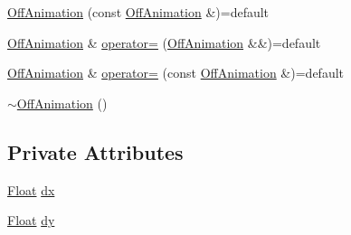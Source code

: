 \begin{DoxyCompactItemize}
\item 
\hyperlink{classZeta_1_1OffAnimation_a35d1389cd458d4e364e732fe7f0a68b8}{Off\+Animation} (const \hyperlink{classZeta_1_1OffAnimation}{Off\+Animation} \&)=default
\item 
\hyperlink{classZeta_1_1OffAnimation}{Off\+Animation} \& \hyperlink{classZeta_1_1OffAnimation_a10c6dd51ce28d6c4ec72d0f38b6c0237}{operator=} (\hyperlink{classZeta_1_1OffAnimation}{Off\+Animation} \&\&)=default
\item 
\hyperlink{classZeta_1_1OffAnimation}{Off\+Animation} \& \hyperlink{classZeta_1_1OffAnimation_ac192d9ec8923e7b494fc12796eea98fe}{operator=} (const \hyperlink{classZeta_1_1OffAnimation}{Off\+Animation} \&)=default
\item 
\hyperlink{classZeta_1_1OffAnimation_af077c1c6a11064df0bbec8d0255c6f6c}{$\sim$\+Off\+Animation} ()
\end{DoxyCompactItemize}
\subsection*{Private Attributes}
\begin{DoxyCompactItemize}
\item 
\hyperlink{namespaceZeta_a1e0a1265f9b3bd3075fb0fabd39088ba}{Float} \hyperlink{classZeta_1_1OffAnimation_ab879452af04426400b413016d06e323d}{dx}
\item 
\hyperlink{namespaceZeta_a1e0a1265f9b3bd3075fb0fabd39088ba}{Float} \hyperlink{classZeta_1_1OffAnimation_ac8e57a2ab7810a34f1b984e72cb68081}{dy}
\end{DoxyCompactItemize}


